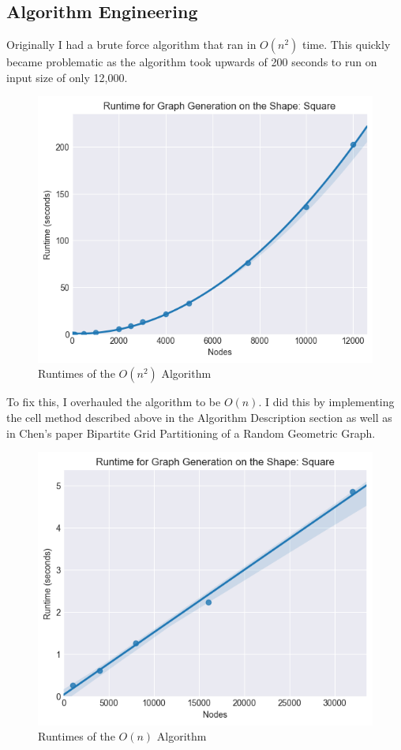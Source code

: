 \documentclass{article}
\begin{document}
	  \subsection{Algorithm Engineering}
	  Originally I had a brute force algorithm that ran in $O(n^2)$ time.
	  This quickly became problematic as the algorithm took upwards of 200 seconds to run on input size of only 12,000.
	  \begin{figure}[H]
		\centering
		\includegraphics[width=1 \textwidth]{square/runtime/runtime_chart_naive}
		\caption{Runtimes of the $O(n^2)$ Algorithm}
	  \end{figure}


	  To fix this, I overhauled the algorithm to be $O(n)$.
	  I did this by implementing the cell method described above in the Algorithm Description section as well as in Chen's paper Bipartite Grid Partitioning of a Random Geometric Graph\cite{chen2017bipartite}.
	  \begin{figure}[H]
		\centering
		\includegraphics[width=1 \textwidth]{square/runtime/runtime_chart}
		\caption{Runtimes of the $O(n)$ Algorithm}
	  \end{figure}
\end{document}
